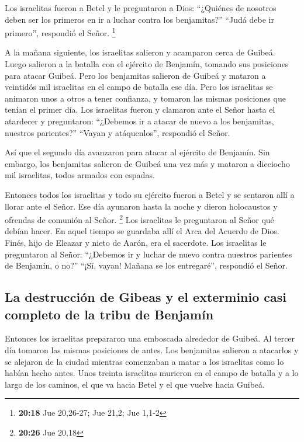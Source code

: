  Los israelitas fueron a Betel y le preguntaron a Dios:
``¿Quiénes de nosotros deben ser los primeros en ir a luchar contra los
benjamitas?'' ``Judá debe ir primero'', respondió el Señor. \footnote{\textbf{20:18}
  Jue 20,26-27; Jue 21,2; Jue 1,1-2}

 A la mañana siguiente, los israelitas salieron y
acamparon cerca de Guibeá.  Luego salieron a la batalla
con el ejército de Benjamín, tomando sus posiciones para atacar Guibeá.
 Pero los benjamitas salieron de Guibeá y mataron a
veintidós mil israelitas en el campo de batalla ese día. 
Pero los israelitas se animaron unos a otros a tener confianza, y
tomaron las mismas posiciones que tenían el primer día. 
Los israelitas fueron y clamaron ante el Señor hasta el atardecer y
preguntaron: ``¿Debemos ir a atacar de nuevo a los benjamitas, nuestros
parientes?'' ``Vayan y atáquenlos'', respondió el Señor.

 Así que el segundo día avanzaron para atacar al ejército
de Benjamín.  Sin embargo, los benjamitas salieron de
Guibeá una vez más y mataron a dieciocho mil israelitas, todos armados
con espadas.

 Entonces todos los israelitas y todo su ejército fueron
a Betel y se sentaron allí a llorar ante el Señor. Ese día ayunaron
hasta la noche y dieron holocaustos y ofrendas de comunión al Señor.
\footnote{\textbf{20:26} Jue 20,18}  Los israelitas le
preguntaron al Señor qué debían hacer. En aquel tiempo se guardaba allí
el Arca del Acuerdo de Dios.  Finés, hijo de Eleazar y
nieto de Aarón, era el sacerdote. Los israelitas le preguntaron al
Señor: ``¿Debemos ir y luchar de nuevo contra nuestros parientes de
Benjamín, o no?'' ``¡Sí, vayan! Mañana se los entregaré'', respondió el
Señor.

\hypertarget{la-destrucciuxf3n-de-gibeas-y-el-exterminio-casi-completo-de-la-tribu-de-benjamuxedn}{%
\subsection{La destrucción de Gibeas y el exterminio casi completo de la
tribu de
Benjamín}\label{la-destrucciuxf3n-de-gibeas-y-el-exterminio-casi-completo-de-la-tribu-de-benjamuxedn}}

 Entonces los israelitas prepararon una emboscada
alrededor de Guibeá.  Al tercer día tomaron las mismas
posiciones de antes.  Los benjamitas salieron a atacarlos
y se alejaron de la ciudad mientras comenzaban a matar a los israelitas
como lo habían hecho antes. Unos treinta israelitas murieron en el campo
de batalla y a lo largo de los caminos, el que va hacia Betel y el que
vuelve hacia Guibeá.

